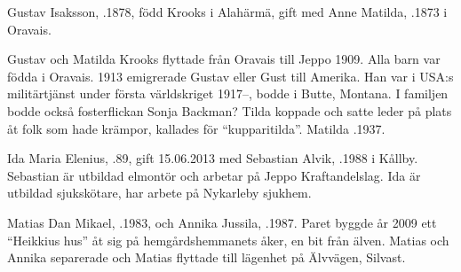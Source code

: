 Gustav Isaksson, .1878, född Krooks i Alahärmä, gift med Anne Matilda, .1873 i Oravais.
\begin{jhchildren}
  \item {}
  \item {}
  \item {}
\end{jhchildren}
Gustav och Matilda Krooks flyttade från Oravais till Jeppo 1909. Alla barn var födda i Oravais. 1913 emigrerade Gustav eller Gust till Amerika. Han var i USA:s militärtjänst under första världskriget 1917--, bodde i Butte, Montana. I familjen bodde också fosterflickan Sonja Backman? Tilda koppade och satte leder på plats åt folk som hade krämpor,  kallades för ``kupparitilda''. 	Matilda .1937.






Ida Maria Elenius, .89, gift 15.06.2013 med Sebastian Alvik, .1988 i Kållby. Sebastian är utbildad elmontör och arbetar på Jeppo Kraftandelslag. Ida är utbildad sjukskötare, har arbete på Nykarleby sjukhem.
\begin{jhchildren}
  \item {}
  \item {}
\end{jhchildren}


Matias Dan Mikael, .1983, och Annika Jussila, .1987. Paret byggde år 2009 ett ``Heikkius hus'' åt sig på hemgårdshemmanets åker, en bit från älven. Matias och Annika separerade och Matias flyttade till lägenhet på Älvvägen, Silvast.
